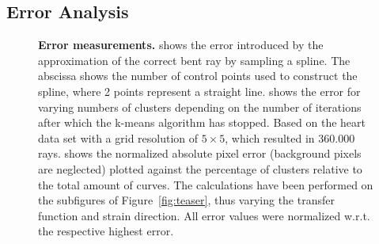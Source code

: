 \documentclass[journal]{vgtc}                %
\begin{document}
\subsection{Error Analysis}\label{subsec:error}
\begin{figure}[t]
    \centering

    \caption{\textbf{Error measurements.}  shows the error introduced by the approximation of the correct bent ray by sampling a spline. The abscissa shows the number of control points used to construct the spline, where 2 points represent a straight line.  shows the error for varying numbers of clusters depending on the number of iterations after which the k-means algorithm has stopped. Based on the heart data set with a grid resolution of $5\times5$, which resulted in 360.000 rays.  shows the normalized absolute pixel error (background pixels are neglected) plotted against the percentage of clusters relative to the total amount of curves. The calculations have been performed on the subfigures of Figure~\ref{fig:teaser}, thus varying the transfer function and strain direction. All error values were normalized w.r.t. the respective highest error.}
    \label{fig:error}
\end{figure}
\end{document}

